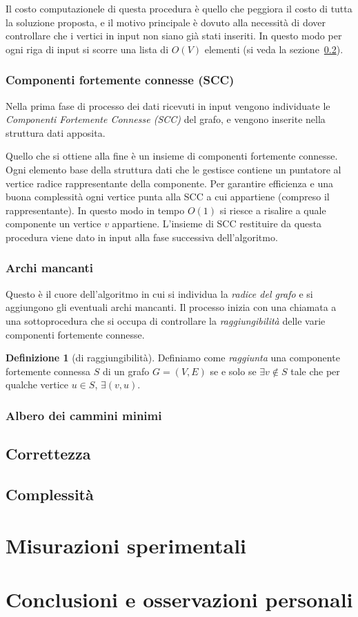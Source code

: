 \documentclass[a4paper,8pt]{article}
\theoremstyle{definition}
\newtheorem{definizione}{Definizione}
\begin{document}
Il costo computazionele di questa procedura è quello che peggiora il costo di tutta
la soluzione proposta, e il motivo principale è dovuto alla necessità di dover
controllare che i vertici in input non siano già stati inseriti. In questo modo
per ogni riga di input si scorre una lista di $O(V)$ elementi (si veda la
sezione~\ref{subsec:complessita}).

\subsubsection{Componenti fortemente connesse (SCC)}
Nella prima fase di processo dei dati ricevuti in input vengono individuate le
\emph{Componenti Fortemente Connesse (SCC)} del grafo, e vengono inserite nella
struttura dati apposita.


Quello che si ottiene alla fine è un insieme di componenti fortemente connesse.
Ogni elemento base della struttura dati che le gestisce contiene un puntatore al
vertice radice rappresentante della componente. Per garantire efficienza e una buona
complessità ogni vertice punta alla SCC a cui appartiene (compreso il rappresentante).
In questo modo in tempo $O(1)$ si riesce a risalire a quale componente un vertice $v$
appartiene. L'insieme di SCC restituire da questa procedura viene dato in input
alla fase successiva dell'algoritmo.

\subsubsection{Archi mancanti}
Questo è il cuore dell'algoritmo in cui si individua la \emph{radice del grafo}
e si aggiungono gli eventuali archi mancanti. Il processo inizia con una chiamata
a una sottoprocedura che si occupa di controllare la \emph{raggiungibilità} delle
varie componenti fortemente connesse.

\begin{definizione}[di raggiungibilità] Definiamo come \emph{raggiunta} una
  componente fortemente connessa $S$ di un grafo $G=(V,E)$ se e solo se
  $\exists{v}\notin{S}$ tale che per qualche vertice $u\in{S}$, $\exists(v,u)$.
\end{definizione}

\subsubsection{Albero dei cammini minimi}
\subsection{Correttezza}
\subsection{Complessità}
\label{subsec:complessita}


\section{Misurazioni sperimentali}

\section{Conclusioni e osservazioni personali}
\end{document}
